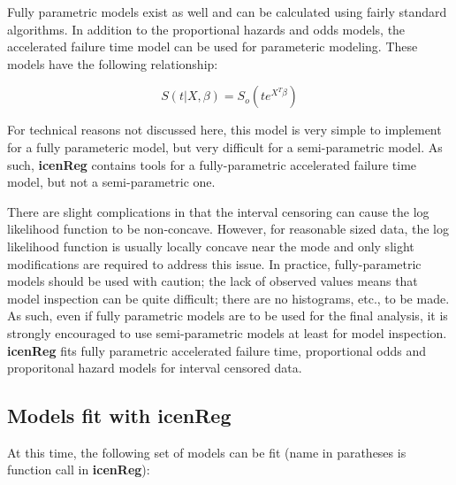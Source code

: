 \documentclass[a4paper]{article}
\begin{document}
  
Fully parametric models exist as well and can be calculated using fairly standard algorithms. In addition to the proportional hazards and odds models, the accelerated failure time  model can be used for parameteric modeling. These models have the following relationship:  
  
\[ S(t | X, \beta) = S_o(t e ^ {X^T \beta}) \]

For technical reasons not discussed here, this model is very simple to implement for a fully parameteric model, but very difficult for a semi-parametric model. As such, {\bf{icenReg}} contains tools for a fully-parametric accelerated failure time model, but not a semi-parametric one. 
  
  
There are slight complications in that the interval censoring can cause the log likelihood function to be non-concave. However, for reasonable sized data, the log likelihood function is usually locally concave near the mode and only slight modifications are required to address this issue. In practice, fully-parametric models should be used with caution; the lack of observed values means that model inspection can be quite difficult; there are no histograms, etc., to be made. As such, even if fully parametric models are to be used for the final analysis, it is strongly encouraged to use semi-parametric models at least for model inspection. {\bf icenReg} fits fully parametric accelerated failure time, proportional odds and  proporitonal hazard models for interval censored data. 
  
\subsection{Models fit with {\bf{icenReg}} }

At this time, the following set of models can be fit (name in paratheses is function call in {\bf{icenReg}}):
  
\end{document}
